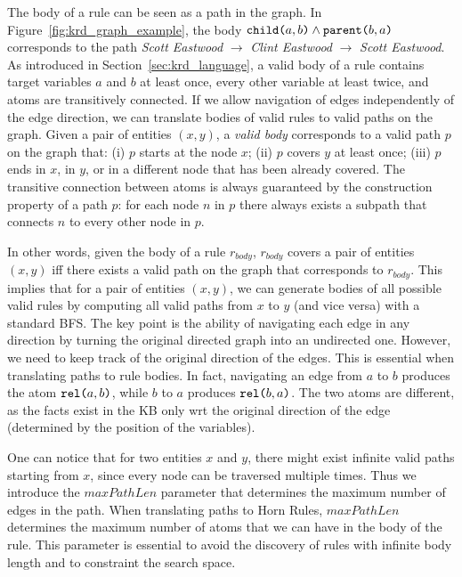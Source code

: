 The body of a rule can be seen as a path in the graph. In Figure~\ref{fig:krd_graph_example}, the body $\texttt{child(}a,b\texttt{)} \wedge \texttt{parent(}b,a\texttt{)}$ corresponds to the path \textit{Scott Eastwood} $\rightarrow$ \textit{Clint Eastwood} $\rightarrow$ \textit{Scott Eastwood}. 
As introduced in Section~\ref{sec:krd_language}, a valid body of a rule contains target variables $a$ and $b$ at least once, every other variable at least twice, and atoms are transitively connected. 
If we allow navigation of edges independently of the edge direction, we can translate bodies of valid rules to valid paths on the graph.
Given a pair of entities $(x,y)$, a {\em valid body} corresponds to a valid path $p$ on the graph that:
(i) $p$ starts at the node $x$;
(ii) $p$ covers $y$ at least once;
(iii) $p$ ends in $x$, in $y$, or in a different node that has been already covered.
The transitive connection between atoms is always guaranteed by the construction property of a path $p$: for each node $n$ in $p$ there always exists a subpath that connects $n$ to every other node in $p$.

In other words, given the body of a rule $r_{body}$, $r_{body}$ covers a pair of entities $(x,y)$ iff there exists a valid path on the graph that corresponds to $r_{body}$. This implies that for a pair of entities $(x,y)$, we can generate bodies of all possible valid rules by computing all valid paths from $x$ to $y$ (and vice versa) with a standard BFS. The key point is the ability of navigating each edge in any direction by turning the original directed graph into an undirected one.
However, we need to keep track of the original direction of the edges. This is essential when translating paths to rule bodies. In fact, %
navigating an edge from $a$ to $b$ produces the atom $\texttt{rel(}a,b\texttt{)}$, while $b$ to $a$ produces $\texttt{rel(}b,a\texttt{)}$. The two atoms are different, as the facts exist in the KB only wrt the original direction of the edge (determined by the position of the variables).

One can notice that for two entities $x$ and $y$, there might exist infinite valid paths starting from $x$, since every node can be traversed multiple times. Thus we introduce the $maxPathLen$ parameter that determines the maximum number of edges in the path. When translating paths to Horn Rules, $maxPathLen$ determines the maximum number of atoms that we can have in the body of the rule. This parameter is essential to avoid the discovery of rules with infinite body length and to constraint the search space.

